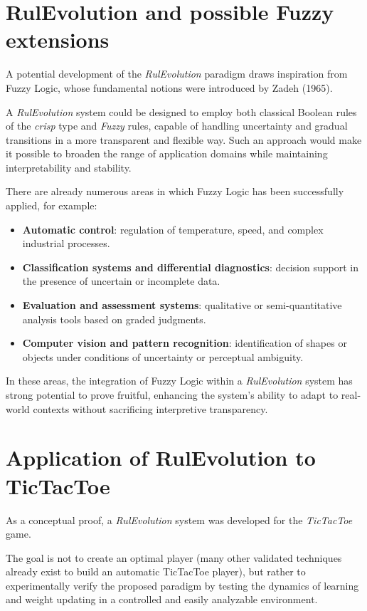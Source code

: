 \documentclass[12pt,a4paper]{article}
\begin{document}
\section{RulEvolution and possible Fuzzy extensions}

A potential development of the \textit{RulEvolution} paradigm draws inspiration from Fuzzy Logic, whose fundamental notions were introduced by Zadeh (1965).

A \textit{RulEvolution} system could be designed to employ both classical Boolean rules of the \textit{crisp} type and \textit{Fuzzy} rules, capable of handling uncertainty and gradual transitions in a more transparent and flexible way.  
Such an approach would make it possible to broaden the range of application domains while maintaining interpretability and stability.  

There are already numerous areas in which Fuzzy Logic has been successfully applied, for example:

\begin{itemize}
    \item \textbf{Automatic control}: regulation of temperature, speed, and complex industrial processes.
    \item \textbf{Classification systems and differential diagnostics}: decision support in the presence of uncertain or incomplete data.
    \item \textbf{Evaluation and assessment systems}: qualitative or semi-quantitative analysis tools based on graded judgments.
    \item \textbf{Computer vision and pattern recognition}: identification of shapes or objects under conditions of uncertainty or perceptual ambiguity.
\end{itemize}

In these areas, the integration of Fuzzy Logic within a \textit{RulEvolution} system has strong potential to prove fruitful, enhancing the system’s ability to adapt to real-world contexts without sacrificing interpretive transparency.


\section{Application of RulEvolution to TicTacToe}

As a conceptual proof, a \textit{RulEvolution} system was developed for the \textit{TicTacToe} game.

The goal is not to create an optimal player (many other validated techniques already exist to build an automatic TicTacToe player), but rather to experimentally verify the proposed paradigm by testing the dynamics of learning and weight updating in a controlled and easily analyzable environment.
\end{document}
